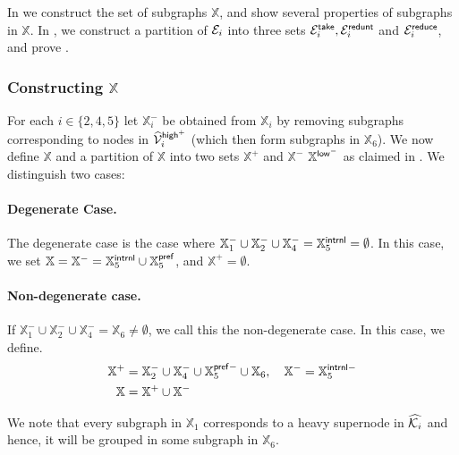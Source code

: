 In  we construct the set of subgraphs $\mathbb{X}$, and show several properties of subgraphs in $\mathbb{X}$. In , we construct a partition of $\mathcal{E}_i$ into three sets $\mathcal{E}^{\mathsf{take}}_i, \mathcal{E}^{\mathsf{redunt}}_i$ and $\mathcal{E}_i^{\mathsf{reduce}}$, and prove . 


\subsubsection{Constructing $\mathbb{X}$}\label{subsec:X-T2}
 
 For each $i\in \{2,4,5\}$ let $\mathbb{X}_i^{-}$ be obtained from $\mathbb{X}_i$ by removing subgraphs corresponding to nodes in  $\widehat{\mathcal{V}}_i^{\mathsf{high}^+}$ (which then form subgraphs in $\mathbb{X}_6$).  We now define $\mathbb{X}$ and a partition of $\mathbb{X}$ into two sets $\mathbb{X}^{+}$ and 	$\mathbb{X}^{-}$ $\mathbb{X}^{\mathsf{low}^-}$ %
 as claimed in . We distinguish two cases:
 
\paragraph{Degenerate Case.~} The degenerate case is the case where   $\mathbb{X}^{-}_1\cup \mathbb{X}^{-}_2\cup \mathbb{X}^{-}_4 = \mathbb{X}^{\mathsf{intrnl}}_5 =  \emptyset$. In this case, we set $\mathbb{X} = \mathbb{X}^{-} =  \mathbb{X}_5^{\mathsf{intrnl}} \cup \mathbb{X}_5^{\mathsf{pref}}$, and $	\mathbb{X}^{+} = 	 \emptyset$. 

\paragraph{Non-degenerate case.~} If $\mathbb{X}^{-}_1\cup \mathbb{X}^{-}_2\cup \mathbb{X}^{-}_4 = \mathbb{X}_6 \not=  \emptyset$, we call this the non-degenerate case. In this case, we define.
\begin{equation}\label{eq:MathbbX}
	\begin{split}
		\mathbb{X}^{+} &=    \mathbb{X}^{-}_2\cup \mathbb{X}^{-}_4 \cup \mathbb{X}_5^{\mathsf{pref}-} \cup \mathbb{X}_6, \quad
		\mathbb{X}^{-} = \mathbb{X}_5^{\mathsf{intrnl} -} \\
		\mathbb{X} &= \mathbb{X}^{+}\cup \mathbb{X}^{-}
	\end{split}
\end{equation}

We note that every subgraph in $\mathbb{X}_1$ corresponds to a heavy supernode in $\widehat{\mathcal{K}_i}$ and hence, it will be grouped in some subgraph in $\mathbb{X}_6$. 


